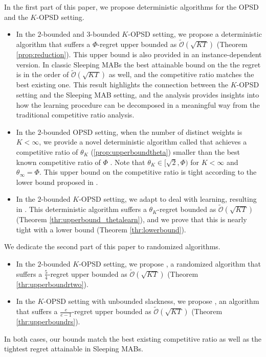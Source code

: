 In the first part of this paper, we propose deterministic algorithms for the OPSD and the $K$-OPSD setting.
\begin{itemize}
    \item In the $2$-bounded and $3$-bounded $K$-OPSD setting, we propose a deterministic algorithm that suffers a $\Phi$-regret upper bounded as $\widetilde{\mathcal{O}}\left(\sqrt{KT}\right)$ (Theorem \ref{prop:reduction}). This upper bound is also provided in an instance-dependent version. In classic Sleeping MABs the best attainable bound on the the regret is in the order of $\widetilde{\mathcal{O}}\left(\sqrt{KT}\right)$ as well, and the competitive ratio matches the best existing one. This result highlights the connection between the $K$-OPSD setting and the Sleeping MAB setting, and the analysis provides insights into how the learning procedure can be decomposed in a meaningful way from the traditional competitive ratio analysis.
    \item In the $2$-bounded OPSD setting, when the number of distinct weights is $K<\infty$, we provide a novel deterministic algorithm called \algtheta that achieves a competitive ratio of $\theta_K$ (\ref{prop:upperboundtheta}) smaller than the best known competitive ratio of $\Phi$ \cite{hajek2001competitiveness}. Note that $\theta_K \in [\sqrt{2}, \Phi)$ for $K<\infty$ and $\theta_\infty = \Phi$. This upper bound on the competitive ratio is tight according to the lower bound proposed in \cite{hajek2001competitiveness}.
    \item In the $2$-bounded $K$-OPSD setting, we adapt \algtheta to deal with learning, resulting in \algthetalearn. This deterministic algorithm suffers a $\theta_K$-regret bounded as $\widetilde{\mathcal{O}}\left(\sqrt{KT}\right)$ (Theorem \ref{thr:upperbound_thetalearn}), and we prove that this is nearly tight with a lower bound (Theorem \ref{thr:lowerbound}).
\end{itemize}

We dedicate the second part of this paper to randomized algorithms.
\begin{itemize}
    \item  In the $2$-bounded $K$-OPSD setting, we propose \algrtwo, a randomized algorithm that suffers a $\frac{5}{4}$-regret upper bounded as $\widetilde{\mathcal{O}}\left(\sqrt{KT}\right)$ (Theorem \ref{thr:upperboundrtwo}).
    \item In the $K$-OPSD setting with unbounded slackness, we propose \algrs, an algorithm that suffers a $\frac{e}{e-1}$-regret upper bounded as $\widetilde{\mathcal{O}}\left(\sqrt{KT}\right)$ (Theorem \ref{thr:upperboundrs}).
\end{itemize}
In both cases, our bounds match the best existing competitive ratio as well as the tightest regret attainable in Sleeping MABs.
